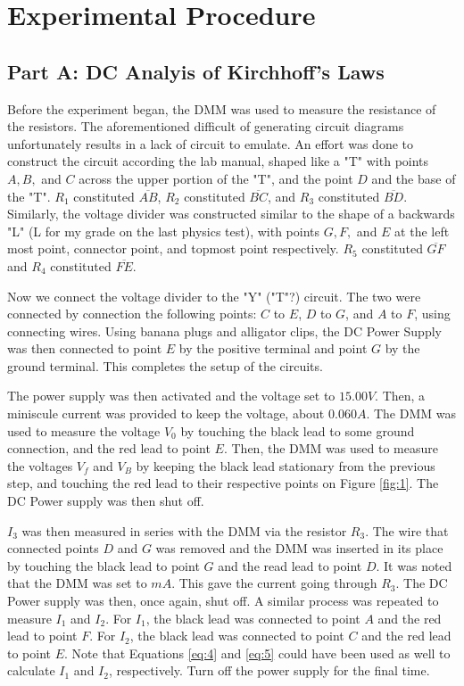 \documentclass{article}
\begin{document}
\section{Experimental Procedure}
\subsection*{Part A: DC Analyis of Kirchhoff's Laws}
Before the experiment began, the DMM was used to measure the resistance of the resistors. 
The aforementioned difficult of generating circuit diagrams unfortunately results in a lack of circuit to emulate. An effort was done 
to construct the circuit according the lab manual, shaped like a "T" with points $A, B,$ and $C$ across the upper portion of the "T", and
the point $D$ and the base of the "T". $R_1$ constituted $\overline{AB}$, $R_2$ constituted $\overline{BC}$, and $R_3$ constituted $\overline{BD}$.
Similarly, the voltage divider was constructed similar to the shape of a backwards "L" (L for my grade on the last physics test), with points $G, F,$ and $E$ 
at the left most point, connector point, and topmost point respectively. $R_5$ constituted $\overline{GF}$ and $R_4$ constituted $\overline{FE}$.

Now we connect the voltage divider to the "Y" ("T"?) circuit. The two were connected by connection the following points:
$C$ to $E$, $D$ to $G$, and $A$ to $F$, using connecting wires. Using banana plugs and alligator clips, the DC Power Supply was then connected
to point $E$ by the positive terminal and point $G$ by the ground terminal. 
This completes the setup of the circuits.

The power supply was then activated and the voltage set to $15.00 V$. Then, a miniscule current was provided to keep the voltage,
about $0.060 A$. The DMM was used to measure the voltage $V_0$ by touching the black lead to some ground connection, and the red lead to point $E$.
Then, the DMM was used to measure the voltages $V_f$ and $V_B$ by keeping the black lead stationary from the previous step, 
and touching the red lead to their respective points on Figure \ref{fig:1}.
The DC Power supply was then shut off.

$I_3$ was then measured in series with the DMM via the resistor $R_3$. The wire that connected points 
$D$ and $G$ was removed and the DMM was inserted in its place by touching the black lead to point $G$ and the read lead to point $D$. It was noted that the DMM was set to $mA$. This gave the current going through $R_3$. 
The DC Power supply was then, once again, shut off. A similar process was repeated to measure $I_1$ and $I_2$. For $I_1$, the black lead was connected to point $A$ and the red lead to point $F$.
For $I_2$, the black lead was connected to point $C$ and the red lead to point $E$. Note that Equations
\ref{eq:4} and \ref{eq:5} could have been used as well to calculate $I_1$ and $I_2$, respectively. Turn off the power supply for the final time.
\end{document}
